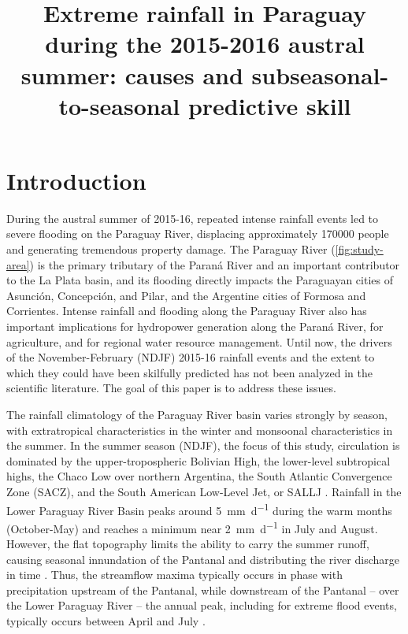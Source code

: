 \documentclass[twocol]{ametsoc}
\title{Extreme rainfall in Paraguay during the 2015-2016 austral summer: causes and subseasonal-to-seasonal predictive skill}
\affiliation{Dept. of Earth and Environmental Engineering, Columbia University, 500 W. 120th St., New York, NY. USA \\ Columbia Water Center, Columbia University, 500 W. 120th St., New York, NY. USA}
\begin{document}
\maketitle


\section{Introduction}

During the austral summer of 2015-16, repeated intense rainfall events led to severe flooding on the Paraguay River, displacing approximately \num{170000} people \citep{BrackenridgeDFO} and generating tremendous property damage.
The Paraguay River (\cref{fig:study-area}) is the primary tributary of the Paran\'{a} River and an important contributor to the La Plata basin, and its flooding directly impacts the Paraguayan cities of Asunci\'{o}n, Concepci\'{o}n, and Pilar, and the Argentine cities of Formosa and Corrientes.
Intense rainfall and flooding along the Paraguay River also has important implications for hydropower generation along the Paran\'{a} River, for agriculture, and for regional water resource management.
Until now, the drivers of the November-February (NDJF) 2015-16 rainfall events and the extent to which they could have been skilfully predicted has not been analyzed in the scientific literature.
The goal of this paper is to address these issues.

The rainfall climatology of the Paraguay River basin varies strongly by season, with extratropical characteristics in the winter and monsoonal characteristics in the summer.
In the summer season (NDJF), the focus of this study, circulation is dominated by the upper-tropospheric Bolivian High, the lower-level subtropical highs, the Chaco Low over northern Argentina, the South Atlantic Convergence Zone (SACZ), and the South American Low-Level Jet, or SALLJ \citep{Grimm2009,Marengo:2012cm}.
Rainfall in the Lower Paraguay River Basin peaks around \SI{5}{\milli\meter\per\day} during the warm months (October-May) and reaches a minimum near \SI{2}{\milli\meter\per\day} in July and August.
However, the flat topography limits the ability to carry the summer runoff, causing seasonal innundation of the Pantanal and distributing the river discharge in time \citep{Bravo:2011et,Barros:2004bn}.
Thus, the streamflow maxima typically occurs in phase with precipitation upstream of the Pantanal, while downstream of the Pantanal -- over the Lower Paraguay River -- the annual peak, including for extreme flood events, typically occurs between April and July \citep{Barros:2004bn}.
\end{document}
